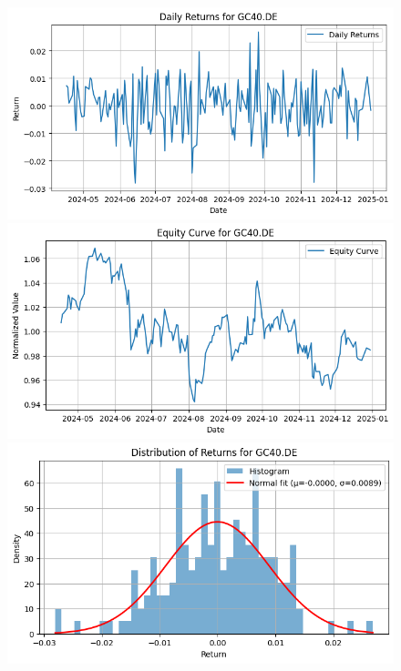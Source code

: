 \documentclass{article}%
\begin{document}
\begin{figure}[htbp]%
\begin{minipage}{0.31\textwidth}%
\includegraphics[width=\linewidth]{ticker_images/GC40.DE_daily_returns.png}%
\end{minipage}%
\begin{minipage}{0.31\textwidth}%
\includegraphics[width=\linewidth]{ticker_images/GC40.DE_equity_curve.png}%
\end{minipage}%
\begin{minipage}{0.31\textwidth}%
\includegraphics[width=\linewidth]{ticker_images/GC40.DE_return_distribution.png}%
\end{minipage}%
\end{figure}
\end{document}
